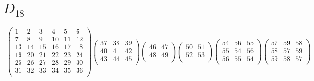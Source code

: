 \documentclass[12pt,a4paper]{amsart}
\begin{document}
\section*{$D_{18}$}
\begin{align*}
\left(\begin{array}{rrrrrr}%
1&2&3&4&5&6\\%
7&8&9&10&11&12\\%
13&14&15&16&17&18\\%
19&20&21&22&23&24\\%
25&26&27&28&29&30\\%
31&32&33&34&35&36\\%
\end{array}\right)%
\left(\begin{array}{rrr}%
37&38&39\\%
40&41&42\\%
43&44&45\\%
\end{array}\right)%
\left(\begin{array}{rr}%
46&47\\%
48&49\\%
\end{array}\right)%
\left(\begin{array}{rr}%
50&51\\%
52&53\\%
\end{array}\right)%
\left(\begin{array}{rrr}%
54&56&55\\%
55&54&56\\%
56&55&54\\%
\end{array}\right)%
\left(\begin{array}{rrr}%
57&59&58\\%
58&57&59\\%
59&58&57\\%
\end{array}\right)%
\end{align*}
\end{document}
